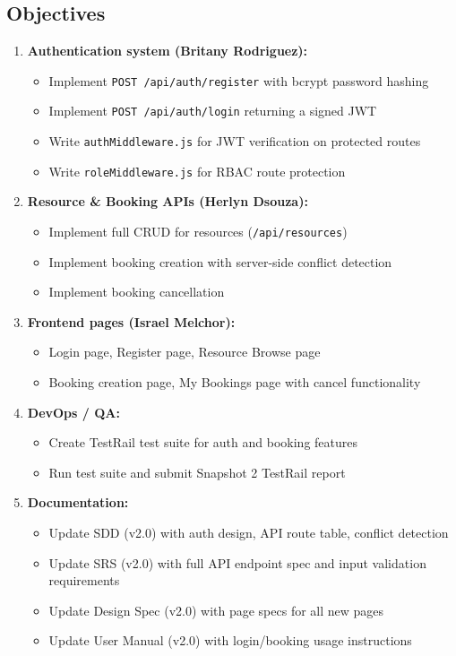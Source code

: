 \documentclass[12pt]{article}
\begin{document}
\subsection{Objectives}
\begin{enumerate}
    \item \textbf{Authentication system (Britany Rodriguez):}
        \begin{itemize}
            \item Implement \texttt{POST /api/auth/register} with bcrypt password hashing
            \item Implement \texttt{POST /api/auth/login} returning a signed JWT
            \item Write \texttt{authMiddleware.js} for JWT verification on protected routes
            \item Write \texttt{roleMiddleware.js} for RBAC route protection
        \end{itemize}
    \item \textbf{Resource \& Booking APIs (Herlyn Dsouza):}
        \begin{itemize}
            \item Implement full CRUD for resources (\texttt{/api/resources})
            \item Implement booking creation with server-side conflict detection
            \item Implement booking cancellation
        \end{itemize}
    \item \textbf{Frontend pages (Israel Melchor):}
        \begin{itemize}
            \item Login page, Register page, Resource Browse page
            \item Booking creation page, My Bookings page with cancel functionality
        \end{itemize}
    \item \textbf{DevOps / QA:}
        \begin{itemize}
            \item Create TestRail test suite for auth and booking features
            \item Run test suite and submit Snapshot 2 TestRail report
        \end{itemize}
    \item \textbf{Documentation:}
        \begin{itemize}
            \item Update SDD (v2.0) with auth design, API route table, conflict detection
            \item Update SRS (v2.0) with full API endpoint spec and input validation requirements
            \item Update Design Spec (v2.0) with page specs for all new pages
            \item Update User Manual (v2.0) with login/booking usage instructions
        \end{itemize}
\end{enumerate}
\end{document}
